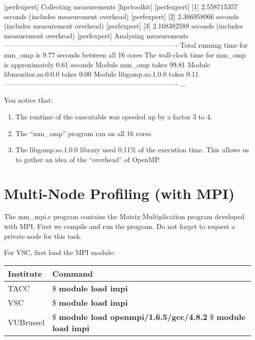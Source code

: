 \begin{prompt}
[perfexpert] Collecting measurements [hpctoolkit]
[perfexpert]    [1] 2.558715357 seconds (includes measurement overhead)
[perfexpert]    [2] 2.366958066 seconds (includes measurement overhead)
[perfexpert]    [3] 2.168382589 seconds (includes measurement overhead)
[perfexpert] Analysing measurements
----------------------------------------------------------------------------
Total running time for mm_omp is 9.77 seconds between all 16 cores
The wall-clock time for mm_omp is approximately 0.61 seconds
Module mm_omp takes 99.81%
Module libmonitor.so.0.0.0 takes 0.00%
Module libgomp.so.1.0.0 takes 0.11%
----------------------------------------------------------------------------
...
\end{prompt}

You notice that:
\begin{enumerate}
  \item  The runtime of the executable was speeded up by a factor 3 to 4.
  \item  The ``mm\_omp'' program ran on all 16 cores.
  \item  The libgomp.so.1.0.0 library used 0.11\% of the execution time. This allows us to gather an idea of the ``overhead'' of OpenMP.
\end{enumerate}

\section{Multi-Node Profiling (with MPI)}
\label{sec:Multi_node_profiling_MPI}

The mm\_mpi.c program contains the Matrix Multiplication program developed with MPI. First we compile and run the program. Do not forget to request a private node for this task.

For VSC, first load the MPI module:

\begin{prompt}
\end{prompt}

\begin{tabular}{|p{}|p{}} \hline
\textbf{Institute}          & \textbf{Command} \\ \hline
TACC                        & \$ \textbf{module load impi} \\ \hline
VSC                         & \$ \textbf{module load impi} \\ \hline
VUBrussel                   & \$ \textbf{module load openmpi/1.6.5/gcc/4.8.2}
                              \$ \textbf{module load impi} \\ \hline
\end{tabular}


